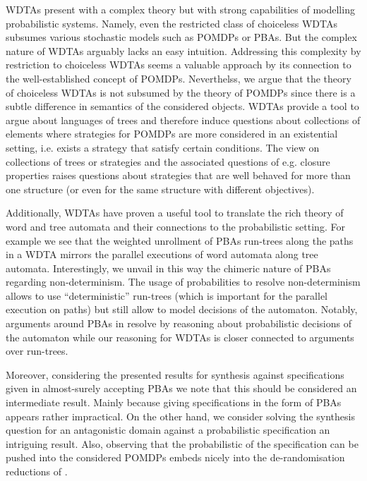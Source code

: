 \acp{WDTA} present with a complex theory but with strong capabilities of
modelling probabilistic systems. Namely, even the restricted class of
choiceless \acp{WDTA} subsumes various stochastic models such as \acp{POMDP} or
\acp{PBA}. But the complex nature of \acp{WDTA} arguably lacks an easy
intuition. Addressing this complexity by restriction to choiceless \acp{WDTA}
seems a valuable approach by its connection to the well-established concept of
\acp{POMDP}. Neverthelss, we argue that the theory of choiceless \acp{WDTA} is
not subsumed by the theory of \acp{POMDP} since there is a subtle difference in
semantics of the considered objects. \acp{WDTA} provide a tool to argue about
languages of trees and therefore induce questions about collections of elements
where strategies for \acp{POMDP} are more considered in an existential setting,
i.e. exists a strategy that satisfy certain conditions. The view on collections
of trees or strategies and the associated questions of e.g. closure properties
raises questions about strategies that are well behaved for more than one
structure (or even for the same structure with different objectives).

Additionally, \acp{WDTA} have proven a useful tool to translate the rich theory
of word and tree automata and their connections to the probabilistic setting.
For example we see that the weighted unrollment of \acp{PBA} run-trees along
the paths in a \ac{WDTA} mirrors the parallel executions of word automata along
tree automata. Interestingly, we unvail in this way the chimeric nature of
\acp{PBA} regarding non-determinism. The usage of probabilities to resolve
non-determinism allows to use \enquote{deterministic} run-trees (which is
important for the parallel execution on paths) but still allow to model
decisions of the automaton. Notably, arguments around \acp{PBA} in
\cite{Groesser} resolve by reasoning about probabilistic decisions of the
automaton while our reasoning for \acp{WDTA} is closer connected to arguments
over run-trees.

Moreover, considering the presented results for synthesis against
specifications given in almost-surely accepting \acp{PBA} we note that this
should be considered an intermediate result. Mainly because giving
specifications in the form of \acp{PBA} appears rather impractical. On the
other hand, we consider solving the synthesis question for an antagonistic
domain against a probabilistic specification an intriguing result. Also,
observing that the probabilistic of the specification can be pushed into the
considered \acp{POMDP} embeds nicely into the de-randomisation reductions of
\cite{RandomnessForFree}.
